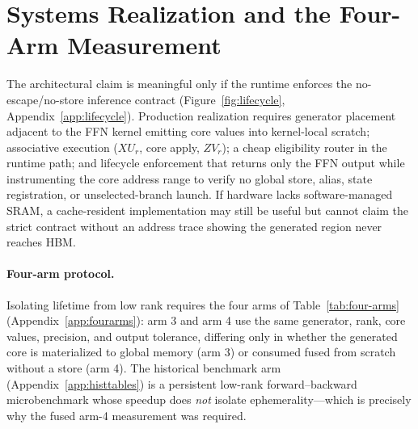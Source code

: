 \section{Systems Realization and the Four-Arm Measurement}
\label{sec:systems}

The architectural claim is meaningful only if the runtime enforces the
no-escape/no-store inference contract (Figure~\ref{fig:lifecycle},
Appendix~\ref{app:lifecycle}). Production realization requires generator
placement adjacent to the FFN kernel emitting core values into kernel-local
scratch; associative execution ($XU_r$, core apply, $ZV_r$); a cheap
eligibility router in the runtime path; and lifecycle enforcement that
returns only the FFN output while instrumenting the core address range to
verify no global store, alias, state registration, or unselected-branch
launch. If hardware lacks software-managed SRAM, a cache-resident
implementation may still be useful but cannot claim the strict contract
without an address trace showing the generated region never reaches HBM.

\paragraph{Four-arm protocol.}
Isolating lifetime from low rank requires the four arms of
Table~\ref{tab:four-arms} (Appendix~\ref{app:fourarms}): arm 3 and arm 4
use the same generator, rank, core values, precision, and output tolerance,
differing only in whether the generated core is materialized to global
memory (arm 3) or consumed fused from scratch without a store (arm 4). The
historical benchmark arm (Appendix~\ref{app:histtables}) is a persistent
low-rank forward--backward microbenchmark whose speedup does \emph{not}
isolate ephemerality---which is precisely why the fused arm-4 measurement
was required.


